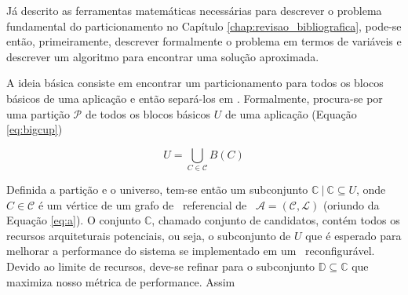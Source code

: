 	Já descrito as ferramentas matemáticas necessárias para descrever o problema fundamental do particionamento no Capítulo \ref{chap:revisao_bibliografica}, pode-se então, primeiramente, descrever formalmente o problema em termos de variáveis e descrever um algoritmo para encontrar uma solução aproximada.

		A ideia básica consiste em encontrar um particionamento para todos os blocos básicos de uma aplicação e então separá-los em \hs.
        Formalmente, procura-se por uma partição $ \mathcal{P} $ de todos os blocos básicos $ U $ de uma aplicação (Equação \ref{eq:bigcup})

        $$ U = \bigcup_{C \in \mathcal{C}} B(C) $$

		Definida a partição e o universo, tem-se então um subconjunto $ \mathbb{C}\ |\ \mathbb{C} \subseteq U $, onde $ C \in \mathcal{C} $ é um vértice de um grafo de \design\ referencial de \software\ $ \mathcal{A} = (\mathcal{C}, \mathcal{L}) $ (oriundo da Equação \ref{eq:a}). O conjunto $ \mathbb{C} $, chamado conjunto de candidatos, contém todos os recursos arquiteturais potenciais, ou seja, o subconjunto de $ U $ que é esperado para melhorar a performance do sistema se implementado em um \hardware\ reconfigurável.
        Devido ao limite de recursos, deve-se refinar para o subconjunto $ \mathbb{D} \subseteq \mathbb{C} $ que maximiza nosso métrica de performance. Assim

